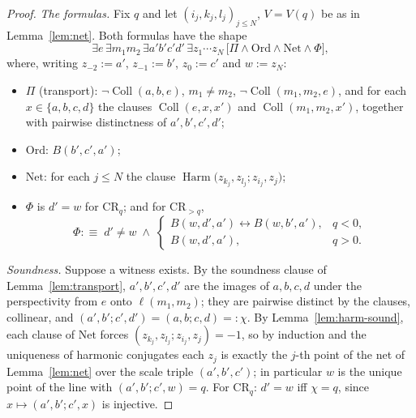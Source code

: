 \documentclass[10pt,a4paper]{amsart}
\newcommand{\Coll}{\operatorname{Coll}}
\newcommand{\Harm}{\operatorname{Harm}}
\begin{document}
\begin{proof}
\emph{The formulas.} Fix $q$ and let $(i_j,k_j,l_j)_{j\le N}$, $V=V(q)$ be as
in Lemma~\ref{lem:net}. Both formulas have the shape
\[
\exists e\,\exists m_1 m_2\,\exists a'b'c'd'\,\exists z_1\cdots z_N\,
\bigl[\Pi\wedge\mathrm{Ord}\wedge\mathrm{Net}\wedge\Phi\bigr],
\]
where, writing $z_{-2}:=a'$, $z_{-1}:=b'$, $z_0:=c'$ and $w:=z_N$:
\begin{itemize}
\item $\Pi$ \textup(transport\textup): $\neg\Coll(a,b,e)$,
$m_1\ne m_2$, $\neg\Coll(m_1,m_2,e)$, and for each
$x\in\{a,b,c,d\}$ the clauses $\Coll(e,x,x')$ and $\Coll(m_1,m_2,x')$,
together with pairwise distinctness of $a',b',c',d'$;
\item $\mathrm{Ord}$: $B(b',c',a')$;
\item $\mathrm{Net}$: for each $j\le N$ the clause
$\Harm\bigl(z_{k_j},z_{l_j};z_{i_j},z_j\bigr)$;
\item $\Phi$ is $d'=w$ for $\mathrm{CR}_q$; and for $\mathrm{CR}_{>q}$,
\[
\Phi:\equiv\;d'\ne w\;\wedge\;
\begin{cases}
B(w,d',a')\leftrightarrow B(w,b',a'), & q<0,\\[1mm]
B(w,d',a'), & q>0 .
\end{cases}
\]
\end{itemize}

\emph{Soundness.} Suppose a witness exists. By the soundness clause of
Lemma~\ref{lem:transport}, $a',b',c',d'$ are the images of $a,b,c,d$ under
the perspectivity from $e$ onto $\ell(m_1,m_2)$; they are pairwise distinct
by the clauses, collinear, and
$(a',b';c',d')=(a,b;c,d)=:\chi$. By Lemma~\ref{lem:harm-sound}, each clause
of $\mathrm{Net}$ forces $(z_{k_j},z_{l_j};z_{i_j},z_j)=-1$, so by induction
and the uniqueness of harmonic conjugates each $z_j$ is exactly the $j$-th
point of the net of Lemma~\ref{lem:net} over the scale triple
$(a',b',c')$; in particular $w$ is the unique point of the line with
$(a',b';c',w)=q$. For $\mathrm{CR}_q$: $d'=w$ iff $\chi=q$, since
$x\mapsto(a',b';c',x)$ is injective.


\end{proof}
\end{document}
